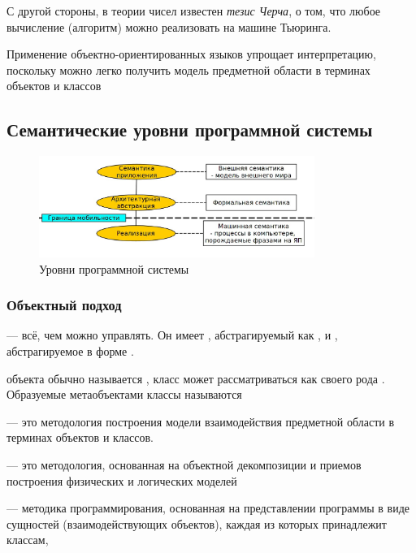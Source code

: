 \documentclass[a4paper, 14pt]{extarticle}
\begin{document}
С другой стороны, в теории чисел известен \textit{тезис Черча}, о том, что любое вычисление (алгоритм) можно реализовать на машине Тьюринга.

Применение объектно-ориентированных языков упрощает интерпретацию, поскольку можно легко получить модель предметной области в терминах объектов и классов

\subsection{Семантические уровни программной системы}
\begin{figure}[h]
    \centering
    \includegraphics[width=0.8\textwidth]{./img/L1/S002.jpg}
    \caption{Уровни программной системы}%
    \label{img:l1:2}
\end{figure}

\subsubsection*{Объектный подход}
 --- всё, чем можно управлять. Он имеет , абстрагируемый как , и , абстрагируемое в форме . 

 объекта обычно называется , класс может рассматриваться как своего рода . Образуемые метаобъектами классы называются 

 --- это методология построения модели взаимодействия предметной области в терминах объектов и классов.

 --- это методология, основанная на объектной декомпозиции и приемов построения физических и логических моделей

 --- методика программирования, основанная на представлении программы в виде сущностей (взаимодействующих объектов), каждая из которых принадлежит классам, 
\end{document}
